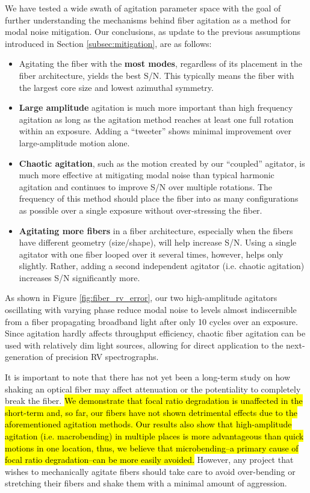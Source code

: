\documentclass[twocolumn]{emulateapj}
\begin{document}
We have tested a wide swath of agitation parameter space with the goal of further understanding the mechanisms behind fiber agitation as a method for modal noise mitigation. Our conclusions, as update to the previous assumptions introduced in Section \ref{subsec:mitigation}, are as follows:
\begin{itemize}
\item Agitating the fiber with the \textbf{most modes}, regardless of its placement in the fiber architecture, yields the best S/N. This typically means the fiber with the largest core size and lowest azimuthal symmetry.
\item \textbf{Large amplitude} agitation is much more important than high frequency agitation as long as the agitation method reaches at least one full rotation within an exposure. Adding a ``tweeter'' shows minimal improvement over large-amplitude motion alone.
\item \textbf{Chaotic agitation}, such as the motion created by our ``coupled'' agitator, is much more effective at mitigating modal noise than typical harmonic agitation and continues to improve S/N over multiple rotations. The frequency of this method should place the fiber into as many configurations as possible over a single exposure without over-stressing the fiber.
\item \textbf{Agitating more fibers} in a fiber architecture, especially when the fibers have different geometry (size/shape), will help increase S/N. Using a single agitator with one fiber looped over it several times, however, helps only slightly. Rather, adding a second independent agitator (i.e. chaotic agitation) increases S/N significantly more.
\end{itemize}

As shown in Figure \ref{fig:fiber_rv_error}, our two high-amplitude agitators oscillating with varying phase reduce modal noise to levels almost indiscernible from a fiber propagating broadband light after only 10 cycles over an exposure. Since agitation hardly affects throughput efficiency, chaotic fiber agitation can be used with relatively dim light sources, allowing for direct application to the next-generation of precision RV spectrographs.

It is important to note that there has not yet been a long-term study on how shaking an optical fiber may affect attenuation or the potentiality to completely break the fiber. \hl{We demonstrate that focal ratio degradation is unaffected in the short-term and, so far, our fibers have not shown detrimental effects due to the aforementioned agitation methods. Our results also show that high-amplitude agitation (i.e. macrobending) in multiple places is more advantageous than quick motions in one location, thus, we believe that microbending--a primary cause of focal ratio degradation--can be more easily avoided.} However, any project that wishes to mechanically agitate fibers should take care to avoid over-bending or stretching their fibers and shake them with a minimal amount of aggression.
\end{document}
